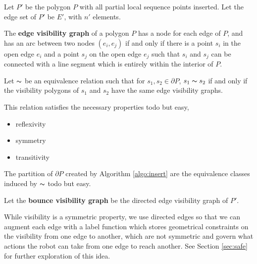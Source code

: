 \documentclass[]{styles/svproc}  %
\begin{document}
Let $P'$ be the polygon $P$ with all partial local sequence points inserted.
Let the edge set of $P'$ be $E'$, with $n'$ elements.

\begin{definition}
The \textbf{edge visibility graph} of a polygon $P$ has a node for each edge of
$P$, and has an arc between two nodes $(e_i, e_j)$ if and only if there is a
point $s_i$ in the open edge $e_i$ and a point $s_j$ on the open edge $e_j$ such
that $s_i$ and $s_j$ can be connected with a line segment which is entirely
within the interior of $P$.
\end{definition}

\begin{definition}
Let $\thicksim$ be an equivalence relation such that for $s_1, s_2 \in \partial
P$, $s_1 \thicksim s_2$ if and only if the visibility polygons of $s_1$ and $s_2$ have
the same edge visibility graphs.
\end{definition}

This relation satisfies the necessary
properties {\color{red} todo but easy},

\begin{itemize}
\item reflexivity
\item symmetry
\item transitivity
\end{itemize}

The partition of $\partial P$ created by Algorithm \ref{algo:insert} are the
equivalence classes induced by $\thicksim$ {\color{red} todo but easy}.


\begin{definition}
Let the \textbf{bounce visibility graph} be the directed edge visibility graph of
$P'$.
\end{definition}

While visibility is a symmetric property, we use directed edges so that 
we can augment each edge with a label function which stores
geometrical constraints on the visibility from one edge to another, which are
not symmetric and govern what actions the robot can take from one edge to
reach another. See Section \ref{sec:safe} for further exploration of this idea.
\end{document}
